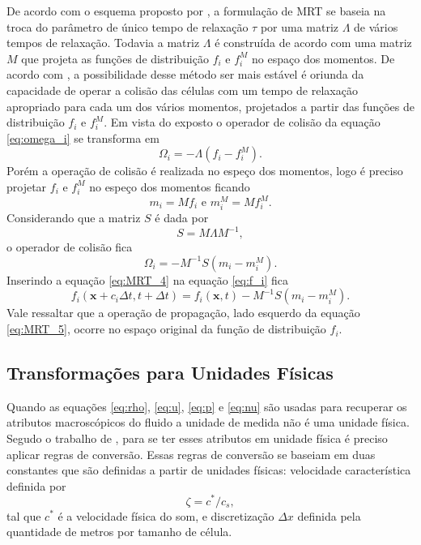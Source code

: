 De acordo com o esquema proposto por , a formulação de MRT se baseia na troca do parâmetro de único tempo de relaxação $\tau$ por uma matriz \textbf{$\Lambda$} de vários tempos de relaxação. Todavia a matriz \textbf{$\Lambda$} é construída de acordo com uma matriz \textbf{$M$} que projeta as funções de distribuição $f_{i}$ e $f_{i}^{M}$ no espaço dos momentos. De acordo com , a possibilidade desse método ser mais estável é oriunda da capacidade de operar a colisão das células com um tempo de relaxação apropriado para cada um dos vários momentos, projetados a partir das funções de distribuição $f_{i}$ e $f_{i}^{M}$. Em vista do exposto o operador de colisão da equação \ref{eq:omega_i} se transforma em
\begin{equation}
	\Omega_{i} = -\textbf{$\Lambda$}(f_{i} - f_{i}^{M}).
    \label{eq:MRT_1}
\end{equation}
Porém a operação de colisão é realizada no espeço dos momentos, logo é preciso projetar $f_{i}$ e $f_{i}^{M}$ no espeço dos momentos ficando
\begin{equation}
	m_{i} = \textbf{$M$}f_{i} \text{ e } m_{i}^{M} = \textbf{$M$}f_{i}^{M}.
    \label{eq:MRT_2}
\end{equation}
Considerando que a matriz \textbf{$S$} é dada por
\begin{equation}
	\textbf{$S$} = \textbf{$M$}\textbf{$\Lambda$}\textbf{$M$}^{-1},
    \label{eq:MRT_3}
\end{equation}
o operador de colisão fica
\begin{equation}
	\Omega_{i} = -\textbf{$M$}^{-1}\textbf{$S$}(m_{i} - m_{i}^{M}).
    \label{eq:MRT_4}
\end{equation}
Inserindo a equação \ref{eq:MRT_4} na equação \ref{eq:f_i} fica
\begin{equation}
	f_{i}(\textbf{x} + c_{i}\Delta t, t + \Delta t) = f_{i}(\textbf{x}, t) -\textbf{$M$}^{-1}\textbf{$S$}(m_{i} - m_{i}^{M}).
    \label{eq:MRT_5}
\end{equation}
Vale ressaltar que a operação de propagação, lado esquerdo da equação \ref{eq:MRT_5}, ocorre no espaço original da função de distribuição $f_{i}$.

\subsection{Transformações para Unidades Físicas}

Quando as equações \ref{eq:rho}, \ref{eq:u}, \ref{eq:p} e \ref{eq:nu} são usadas para recuperar os atributos macroscópicos do fluido a unidade de medida não é uma unidade física. Segudo o trabalho de , para se ter esses atributos em unidade física é preciso aplicar regras de conversão. Essas regras de conversão se baseiam em duas constantes que são definidas a partir de unidades físicas: velocidade característica definida por   
\begin{equation}
	\zeta = c^{*}/c_{s},
    \label{eq:conversao_1}
\end{equation}
tal que $c^{*}$ é a velocidade física do som, e discretização $\Delta x$ definida pela quantidade de metros por tamanho de célula.

